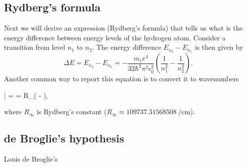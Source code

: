 \documentclass[../Main/chem331-notes.tex]{subfiles}
\begin{document}

\subsection{Rydberg's formula}
Next we will derive an expression (Rydberg's formula) that tells us what is the energy difference between energy levels of the hydrogen atom.
Consider a transition from level $n_1$ to $n_2$.
The energy difference $E_{n_2} - E_{n_1}$ is then given by
\begin{equation}
\Delta E = E_{n_2} - E_{n_1} = - \frac{m_e e^4}{32\hbar^2 \pi^2 \epsilon_0^2 } \left(\frac{1}{n_1^2} - \frac{1}{n_2^2} \right).
\end{equation}
Another common way to report this equation is to convert it to wavenumbers
\begin{iequation}
\bar{\nu} =  = R_\infty \left( -  \right),
\end{iequation}
where $R_\infty$ is Rydberg's constant ($R_\infty \approx \SI{109737.31568508}{\per\centi\meter}$).

\subsection{de Broglie's hypothesis}
Louis de Broglie's
\end{document}

